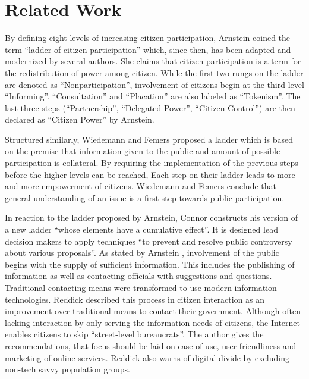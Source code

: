 \section{Related Work}



\label{chap:related_work}
By defining eight levels of increasing citizen participation, Arnstein \cite{Arnstein1969_citizen_participation} coined the term ``ladder of citizen participation'' which, since then, has been adapted and modernized \cite{Connor1988_new_ladder,carver2003future,Collins2009_social_learning,you2009_participatory_map_based,Cai2009_spatial_annotation_deliberation,Macintosh2004_eParticipation_characterization} by several authors. She claims that citizen participation is a term for the redistribution of power among citizen. While the first two rungs on the ladder are denoted as ``Nonparticipation'', involvement of citizens begin at the third level ``Informing''. ``Consultation'' and ``Placation'' are also labeled as ``Tokenism''. The last three steps (``Partnership'', ``Delegated Power'', ``Citizen Control'') are then declared as ``Citizen Power'' by Arnstein.

Structured similarly, Wiedemann and Femers \cite{Wiedemann1993355} proposed a ladder which is based on the premise that information given to the public and amount of possible participation is collateral. By requiring the implementation of the previous steps before the higher levels can be reached, Each step on their ladder leads to more and more empowerment of citizens. Wiedemann and Femers conclude that general understanding of an issue is a first step towards public participation.

In reaction to the ladder proposed by Arnstein, Connor \cite{Connor1988_new_ladder} constructs his version of a new ladder ``whose elements have a cumulative effect''. It is designed lead decision makers to apply techniques ``to prevent and resolve public controversy about various proposals''. 
As stated by Arnstein \cite{Arnstein1969_citizen_participation}, involvement of the public begins with the supply of sufficient information.  This includes the publishing of information as well as contacting officials with suggestions and questions. Traditional contacting means were transformed to use modern information technologies. Reddick \cite{Reddick2005_Citizen_interaction_with_egovernment} described this process in citizen interaction as an improvement over traditional means to contact their government. Although often lacking interaction by only serving the information needs of citizens, the Internet enables citizens to skip ``street-level bureaucrats''. The author gives the recommendations, that focus should be laid on ease of use, user friendliness and marketing of online services. Reddick also warns of digital divide by excluding non-tech savvy population groups.

